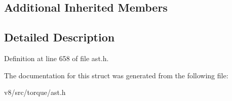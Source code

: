 \subsection*{Additional Inherited Members}


\subsection{Detailed Description}


Definition at line 658 of file ast.\+h.



The documentation for this struct was generated from the following file\+:\begin{DoxyCompactItemize}
\item 
v8/src/torque/ast.\+h\end{DoxyCompactItemize}
